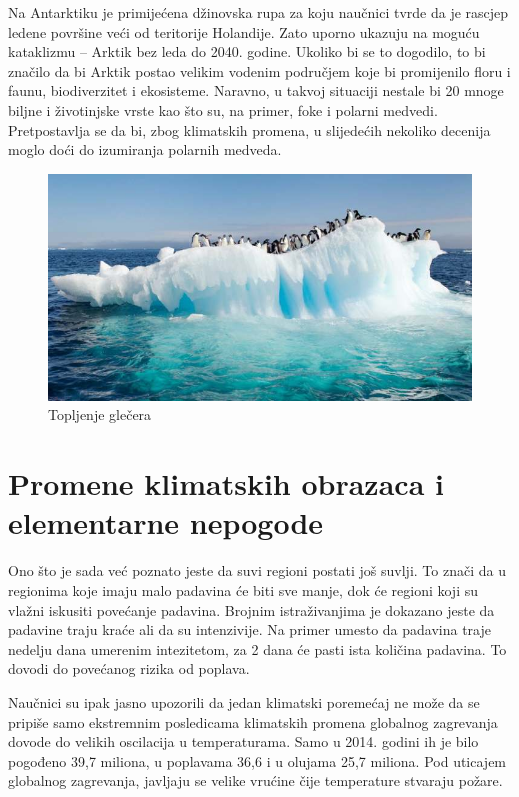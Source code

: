 \documentclass[a4paper]{article}
\begin{document}
Na Antarktiku je primijećena džinovska rupa za koju naučnici tvrde da je rascjep ledene površine veći od teritorije Holandije. Zato uporno ukazuju na moguću kataklizmu – Arktik bez leda do 2040. godine.
Ukoliko bi se to dogodilo, to bi značilo da bi Arktik postao velikim vodenim područjem koje bi promijenilo floru i faunu, biodiverzitet i ekosisteme. Naravno, u takvoj situaciji nestale bi 20 mnoge biljne i životinjske vrste kao što su, na primer, foke i polarni medvedi. Pretpostavlja se da bi, zbog klimatskih promena, u slijedećih nekoliko decenija moglo doći do izumiranja polarnih medveda.

\begin{figure}[!ht]
\begin{center}
\includegraphics[scale=0.5]{slika2.jpg}
\end{center}
\caption{Topljenje glečera}
\label{fig:glecer}
\end{figure}

\section{Promene klimatskih obrazaca
i elementarne nepogode}	
\label{sec:promene_klimatskih_obrazaca}
Ono što je sada već poznato jeste da suvi regioni postati još suvlji. To znači da u regionima koje imaju malo padavina će biti sve manje, dok će regioni  koji su vlažni iskusiti povećanje padavina. 
Brojnim istraživanjima je dokazano jeste da padavine traju kraće ali da su intenzivije. Na primer umesto da padavina traje nedelju dana umerenim intezitetom, za 2 dana će pasti ista količina padavina. To dovodi do povećanog rizika od poplava.

Naučnici su ipak jasno upozorili da jedan klimatski poremećaj ne može da se pripiše samo ekstremnim posledicama klimatskih promena globalnog zagrevanja dovode do velikih oscilacija u temperaturama. Samo u 2014. godini ih je bilo pogođeno 39,7 miliona, u poplavama 36,6 i u olujama 25,7 miliona. Pod uticajem globalnog zagrevanja, javljaju se velike vrućine čije temperature stvaraju  požare.
\end{document}
